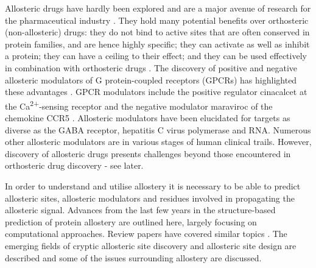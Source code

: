 Allosteric drugs have hardly been explored and are a major avenue of research for the pharmaceutical industry \cite{Wenthur2014}.
They hold many potential benefits over orthosteric (non-allosteric) drugs: they do not bind to active sites that are often conserved in protein families, and are hence highly specific; they can activate as well as inhibit a protein; they can have a ceiling to their effect; and they can be used effectively in combination with orthosteric drugs \cite{Wenthur2014}.
The discovery of positive and negative allosteric modulators of G protein-coupled receptors (GPCRs) has highlighted these advantages \cite{Wootten2013, Conn2009}.
GPCR modulators include the positive regulator cinacalcet at the Ca\textsuperscript{2+}-sensing receptor and the negative modulator maraviroc of the chemokine CCR5 \cite{Nussinov2013}.
Allosteric modulators have been elucidated for targets as diverse as the GABA receptor, hepatitis C virus polymerase and RNA.
Numerous other allosteric modulators are in various stages of human clinical trails.
However, discovery of allosteric drugs presents challenges beyond those encountered in orthosteric drug discovery - see later.

In order to understand and utilise allostery it is necessary to be able to predict allosteric sites, allosteric modulators and residues involved in propagating the allosteric signal.
Advances from the last few years in the structure-based prediction of protein allostery are outlined here, largely focusing on computational approaches.
Review papers have covered similar topics \cite{SchuelerFurman2016, Wagner2016, Guarnera2016, Lu2014}.
The emerging fields of cryptic allosteric site discovery and allosteric site design are described and some of the issues surrounding allostery are discussed.


